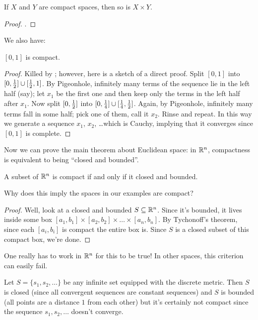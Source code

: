 \begin{theorem}
	\label{thm:tychonoff}
	If $X$ and $Y$ are compact spaces, then so is $X \times Y$.
\end{theorem}
\begin{proof}
	.
\end{proof}

We also have:
\begin{theorem}
	\label{thm:interval_compact}
	$[0,1]$ is compact.
\end{theorem}
\begin{proof}
	Killed by ;
	however, here is a sketch of a direct proof.
	Split $[0,1]$ into $[0,\frac{1}{2}] \cup [\frac{1}{2},1]$.
	By Pigeonhole, infinitely many terms of the sequence lie in the left half (say);
	let $x_1$ be the first one and then keep only the terms in the left half after $x_1$.
	Now split $[0, \frac{1}{2}]$ into $[0,\frac14] \cup [\frac14,\frac{1}{2}]$.
	Again, by Pigeonhole, infinitely many terms fall in some half; pick one of them, call it $x_2$.
	Rinse and repeat.
	In this way we generate a sequence $x_1$, $x_2$, \dots which is Cauchy,
	implying that it converges since $[0,1]$ is complete.
\end{proof}

Now we can prove the main theorem about Euclidean space:
in $\mathbb R^n$, compactness is equivalent to being ``closed and bounded''.
\begin{theorem}
	A subset of $\mathbb R^n$ is compact if and only if it closed and bounded.
	\label{thm:fakeBW}
\end{theorem}
\begin{ques}
	Why does this imply the spaces in our examples are compact?
\end{ques}
\begin{proof}
	Well, look at a closed and bounded $S \subseteq \mathbb R^n$.
	Since it's bounded, it lives inside some box $[a_1, b_1] \times [a_2, b_2] \times \dots \times [a_n, b_n]$.
	By Tychonoff's theorem, since each $[a_i, b_i]$ is compact the entire box is.
	Since $S$ is a closed subset of this compact box, we're done.
\end{proof}

One really has to work in $\mathbb R^n$ for this to be true!
In other spaces, this criterion can easily fail.
\begin{example}
	Let $S = \{s_1, s_2, \dots\}$ be any infinite set equipped with the discrete metric.
	Then $S$ is closed (since all convergent sequences are constant sequences)
	and $S$ is bounded (all points are a distance $1$ from each other)
	but it's certainly not compact since the sequence $s_1, s_2, \dots$ doesn't converge.
\end{example}


